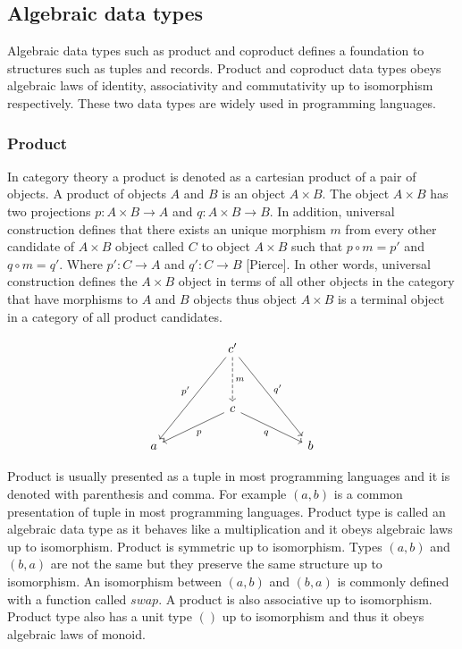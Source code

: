 \documentclass[article]{aaltoseries}
\begin{document}

  \subsection{Algebraic data types}
    Algebraic data types such as product and coproduct defines a foundation to
    structures such as tuples and records. Product and coproduct data types
    obeys algebraic laws of identity, associativity and commutativity up to
    isomorphism respectively. These two data types are widely used in
    programming languages.


  \subsubsection{Product}
    In category theory a product is denoted as a cartesian product of a pair of
    objects. A product of objects $A$ and $B$ is an object $A \times B$. The object $A \times B$
    has two projections $p : A \times B \rightarrow A$ and $q : A \times B \rightarrow B$. In addition, universal
    construction defines that there exists an unique morphism $m$ from every other
    candidate of $A \times B$ object called $C$ to object $A \times B$ such that $p \circ m = p'$ and
    $q \circ m = q'$. Where $p' : C \rightarrow A$ and $q' : C \rightarrow B$ [Pierce]. In other words,
    universal construction defines the $A \times B$ object in terms of all other
    objects in the category that have morphisms to $A$ and $B$ objects thus object $A
    \times B$ is a terminal object in a category of all product candidates.  

    \[
      \begin{tikzcd}[row sep=huge, column sep=huge]
        & c' \arrow[d, dashed, "m"]
        \arrow[ddl, "p'"']
        \arrow[ddr, "q'"]
        & \\
        & c \arrow[dl, "p"]
        \arrow[dr, "q"']
        & \\
        [-2em] a
        &
        & b
      \end{tikzcd}
    \]

    Product is usually presented as a tuple in most programming languages and it
    is denoted with parenthesis and comma. For example $(a, b)$ is a
    common presentation of tuple in most programming languages. Product type is
    called an algebraic data type as it behaves like a multiplication and it
    obeys algebraic laws up to isomorphism. Product is symmetric up to
    isomorphism. Types $(a, b)$ and $(b, a)$ are not the same but they preserve the
    same structure up to isomorphism. An isomorphism between $(a, b)$ and $(b, a)$
    is commonly defined with a function called $swap$. A product is also
    associative up to isomorphism. Product type also has a unit type $()$ up to
    isomorphism and thus it obeys algebraic laws of monoid.
\end{document}
